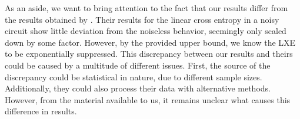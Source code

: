 As an aside, we want to bring attention to the fact that our results differ
from the results obtained by \cite{tikhanovskayaUniversalityCrossEntropy2023}.
Their results for the linear cross entropy in a noisy circuit show little
deviation from the noiseless behavior, seemingly only scaled down by some
factor. However, by the provided upper bound, we know the LXE to be
exponentially suppressed. This discrepancy between our results and theirs could
be caused by a multitude of different issues. First, the source of the
discrepancy could be statistical in nature, due to different sample sizes.
Additionally, they could also process their data with alternative methods.
However, from the material available to us, it remains unclear what causes this
difference in results.



